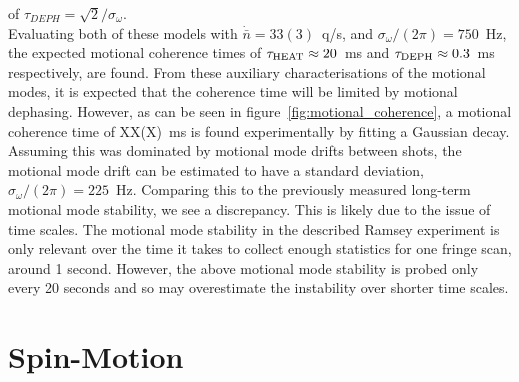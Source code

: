     of $\tau_{DEPH} = \sqrt{2}/\sigma_{\omega}$.\\
    Evaluating both of these models with $\dot{\bar{n}}=33(3)$~q/s, and
    $\sigma_{\omega}/(2\pi) = 750$~\unit{\Hz}, the expected motional coherence times of $\tau_{\rm
    HEAT} \approx 20$~ms and $\tau_{\rm DEPH} \approx 0.3$~ms respectively, are found. From these auxiliary characterisations of the motional modes, it is expected that the coherence time will be limited by motional dephasing.  However, as can be
    seen in figure~\ref{fig:motional_coherence}, a
    motional coherence time of XX(X)~ms is found experimentally by fitting a Gaussian decay.  \\
    Assuming this was dominated by motional mode drifts between shots, the motional mode drift can be estimated to have a standard deviation, $\sigma_{\omega}/(2\pi) =
    225$~\unit{\Hz}. Comparing this to the previously measured long-term motional mode
    stability, we see a discrepancy. This is likely due to the issue of time
    scales. The motional mode stability in the described Ramsey experiment is
    only relevant over the time it takes to collect enough statistics for one
    fringe scan, around 1 second. However, the above motional mode stability is
    probed only every 20 seconds and so may overestimate the instability over
    shorter time scales.\\ 


\section{Spin-Motion}
